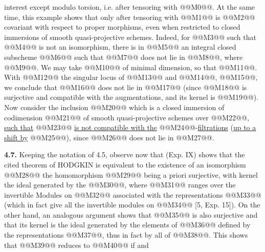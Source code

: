 interest except modulo torsion, i.e. after tensoring with @@M0@@. At the same time, this example shows that only after tensoring with @@M1@@ is @@M2@@ covariant with respect to proper morphisms, even when restricted to closed immersions of smooth quasi-projective schemes. Indeed, for @@M3@@ such that @@M4@@ is not an isomorphism, there is in @@M5@@ an integral closed subscheme @@M6@@ such that @@M7@@ does not lie in @@M8@@, where @@M9@@. We may take @@M10@@ of minimal dimension, so that @@M11@@. With @@M12@@ the singular locus of @@M13@@ and @@M14@@, @@M15@@, we conclude that @@M16@@ does not lie in @@M17@@ (since @@M18@@ is surjective and compatible with the augmentations, and its kernel is @@M19@@). Now consider the inclusion
@@M20@@
which is a closed immersion of codimension @@M21@@ of smooth quasi-projective schemes over @@M22@@, \uline{such that}
@@M23@@
\uline{is not compatible with the} @@M24@@-\uline{filtrations} (\uline{up to a shift by} @@M25@@), since @@M26@@ does not lie in @@M27@@.

\textbf{4.7.} Keeping the notation of 4.5, observe now that (Exp. IX) shows that the cited theorem of HODGKIN is equivalent to the existence of an isomorphism
@@M28@@
the homomorphism @@M29@@ being a priori surjective, with kernel the ideal generated by the @@M30@@, where @@M31@@ ranges over the invertible Modules on @@M32@@ associated with the representations @@M33@@ (which in fact give all the invertible modules on @@M34@@ [5, Exp. 15]). On the other hand, an analogous argument shows that
@@M35@@
is also surjective and that its kernel is the ideal generated by the elements of @@M36@@ defined by the representations @@M37@@, thus in fact by all of @@M38@@. This shows that @@M39@@ reduces to @@M40@@ if and
